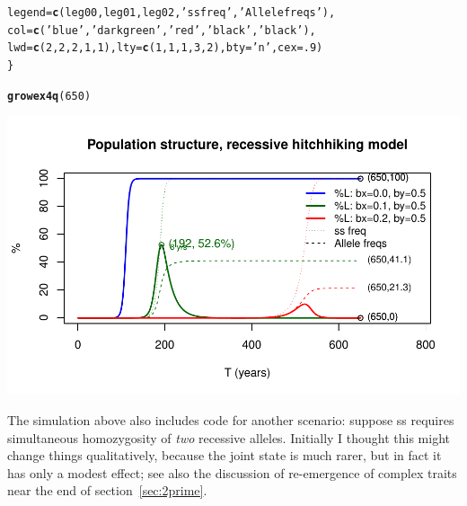 \documentclass{article}\usepackage[]{graphicx}\usepackage[]{color}
\makeatletter
\def\maxwidth{ %
  \ifdim\Gin@nat@width>\linewidth
    \linewidth
  \else
    \Gin@nat@width
  \fi
}
\newcommand{\hlnum}[1]{\textcolor[rgb]{0.686,0.059,0.569}{#1}}%
\newcommand{\hlstr}[1]{\textcolor[rgb]{0.192,0.494,0.8}{#1}}%
\newcommand{\hlstd}[1]{\textcolor[rgb]{0.345,0.345,0.345}{#1}}%
\newcommand{\hlkwc}[1]{\textcolor[rgb]{0.333,0.667,0.333}{#1}}%
\newcommand{\hlkwd}[1]{\textcolor[rgb]{0.737,0.353,0.396}{\textbf{#1}}}%
\newenvironment{kframe}{%
 \def\at@end@of@kframe{}%
 \ifinner\ifhmode%
  \def\at@end@of@kframe{\end{minipage}}%
  \begin{minipage}{\columnwidth}%
 \fi\fi%
 \def\FrameCommand##1{\hskip\@totalleftmargin \hskip-\fboxsep
 \colorbox{shadecolor}{##1}\hskip-\fboxsep
     \hskip-\linewidth \hskip-\@totalleftmargin \hskip\columnwidth}%
 \MakeFramed {\advance\hsize-\width
   \@totalleftmargin\z@ \linewidth\hsize
   \@setminipage}}%
 {\par\unskip\endMakeFramed%
 \at@end@of@kframe}
\newenvironment{knitrout}{}{} %
\makeatother
\begin{document}
\begin{knitrout}
\begin{kframe}
\begin{alltt}
         \hlkwc{legend}\hlstd{=}\hlkwd{c}\hlstd{(leg00,  leg01,       leg02,} \hlstr{'ss freq'}\hlstd{,} \hlstr{'Allele freqs'}\hlstd{),}
         \hlkwc{col}\hlstd{=}   \hlkwd{c}\hlstd{(}\hlstr{'blue'}\hlstd{,} \hlstr{'darkgreen'}\hlstd{,} \hlstr{'red'}\hlstd{,} \hlstr{'black'}\hlstd{,}   \hlstr{'black'}\hlstd{),}
         \hlkwc{lwd}\hlstd{=}\hlkwd{c}\hlstd{(}\hlnum{2}\hlstd{,}\hlnum{2}\hlstd{,}\hlnum{2}\hlstd{,}\hlnum{1}\hlstd{,}\hlnum{1}\hlstd{),} \hlkwc{lty}\hlstd{=}\hlkwd{c}\hlstd{(}\hlnum{1}\hlstd{,}\hlnum{1}\hlstd{,}\hlnum{1}\hlstd{,}\hlnum{3}\hlstd{,}\hlnum{2}\hlstd{),} \hlkwc{bty}\hlstd{=}\hlstr{'n'}\hlstd{,} \hlkwc{cex}\hlstd{=}\hlnum{.9}\hlstd{)}
\hlstd{\}}
\end{alltt}
\end{kframe}
\end{knitrout}

\begin{knitrout}\footnotesize
{}\color{fgcolor}\begin{kframe}
\begin{alltt}
\hlkwd{growex4q}\hlstd{(}\hlnum{650}\hlstd{)}
\end{alltt}
\end{kframe}

{\centering \includegraphics[width=\maxwidth]{asex-figs-knitr/recessive-hitch-1} 

}



\end{knitrout}

The simulation above also includes code for another scenario: suppose ss requires simultaneous homozygosity of \emph{two} recessive alleles.  Initially I thought this might change things qualitatively, because the joint state is much rarer, but in fact it has only a modest effect; see also the discussion of re-emergence of complex traits near the end of section~\ref{sec:2prime}.  
\end{document}
